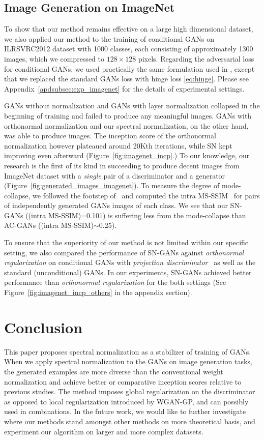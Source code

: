 \subsection{Image Generation on ImageNet}

To show that our method remains effective on a large high dimensional dataset, we also applied our method to the training of conditional GANs on ILRSVRC2012 dataset with 1000 classes, each consisting of approximately 1300 images, which we compressed to $128 \times 128$ pixels. Regarding the adversarial loss for conditional GANs, we used practically the same formulation used in \cite{mirza2014conditional}, except that we replaced the standard GANs loss with hinge loss \eqref{eq:hinge}.
Please see Appendix~\ref{apdsubsec:exp_imagenet} for the details of experimental settings.

GANs without normalization and GANs with layer normalization collapsed in the beginning of training and failed to produce any meaningful images. GANs with orthonormal normalization \cite{brock2016neural} and our spectral normalization, on the other hand, was able to produce images. The inception score of the orthonormal normalization however plateaued around 20Kth iterations, while SN kept improving even afterward (Figure~\ref{fig:imagenet_incp}.) 
To our knowledge, our research is the first of its kind in succeeding to produce decent images from ImageNet dataset with a \textit{single} pair of a discriminator and a generator (Figure~\ref{fig:generated_images_imagenet}).
To measure the degree of mode-collapse, we followed the footstep of~\cite{odena2016conditional} and computed the intra MS-SSIM~\cite{odena2016conditional} for pairs of independently generated GANs images of each class. We see that our SN-GANs ((intra MS-SSIM)=0.101) is suffering less from the mode-collapse than AC-GANs ((intra MS-SSIM)$\sim$0.25).

To ensure that the superiority of our method is not limited within our specific setting, we also compared the performance of SN-GANs against \textit{orthonormal regularization} on conditional GANs with \textit{projection discriminator}~\cite[]{miyato2018cgans} as well as the standard (unconditional) GANs. In our experiments, SN-GANs achieved better performance than \textit{orthonormal regularization} for the both settings (See Figure~\ref{fig:imagenet_incp_others} in the appendix section).

\section{Conclusion}
This paper proposes spectral normalization as a stabilizer of training of GANs. When we apply spectral normalization to the GANs on image generation tasks, the generated examples are more diverse than the conventional weight normalization and achieve better or comparative inception scores relative to previous studies. The method imposes global regularization on the discriminator as opposed to local regularization introduced by WGAN-GP, and can possibly used in combinations. In the future work, we would like to further investigate where our methods stand amongst other methods on more theoretical basis, and experiment our algorithm on larger and more complex datasets.

